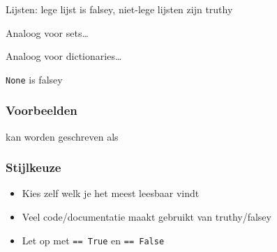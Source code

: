 \documentclass[dutch]{ucll-slides}
\begin{document}
\begin{frame}
\begin{overprint}
\begin{center}
      Lijsten: lege lijst is falsey, niet-lege lijsten zijn truthy
    \end{center}
    \begin{center}
      Analoog voor sets\dots
    \end{center}
    \begin{center}
      Analoog voor dictionaries\dots
    \end{center}
    \begin{center}
      \texttt{None} is falsey
    \end{center}
  \end{overprint}
\end{frame}

\begin{frame}
  \frametitle{Voorbeelden}
  \begin{overprint}
  \end{overprint}
  \begin{center}
    kan worden geschreven als
  \end{center}
  \vskip2mm
  \begin{overprint}
  \end{overprint}
\end{frame}

\begin{frame}
  \frametitle{Stijlkeuze}
  \begin{itemize}
    \item Kies zelf welk je het meest leesbaar vindt
    \item Veel code/documentatie maakt gebruikt van truthy/falsey
    \item Let op met \texttt{== True} en \texttt{== False}
  \end{itemize}
\end{frame}
\end{document}
